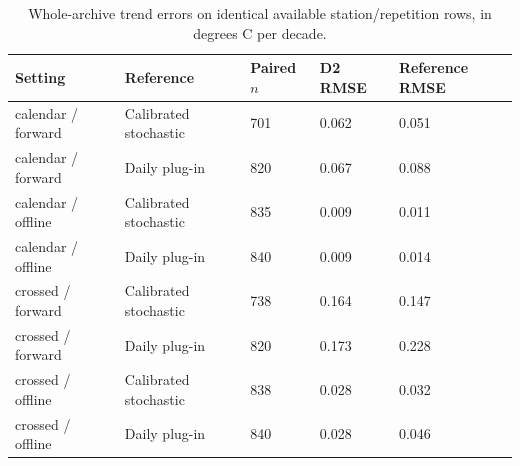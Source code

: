 \begin{table}[p]\centering\small
\caption{Whole-archive trend errors on identical available station/repetition rows, in degrees C per decade.}\label{tab:whole-archive-paired}
\begin{tabular}{lllll}
\toprule
Setting & Reference & Paired $n$ & D2 RMSE & Reference RMSE\\\midrule
calendar / forward & Calibrated stochastic & 701 & 0.062 & 0.051\\
calendar / forward & Daily plug-in & 820 & 0.067 & 0.088\\
calendar / offline & Calibrated stochastic & 835 & 0.009 & 0.011\\
calendar / offline & Daily plug-in & 840 & 0.009 & 0.014\\
crossed / forward & Calibrated stochastic & 738 & 0.164 & 0.147\\
crossed / forward & Daily plug-in & 820 & 0.173 & 0.228\\
crossed / offline & Calibrated stochastic & 838 & 0.028 & 0.032\\
crossed / offline & Daily plug-in & 840 & 0.028 & 0.046\\
\bottomrule\end{tabular}
\end{table}
